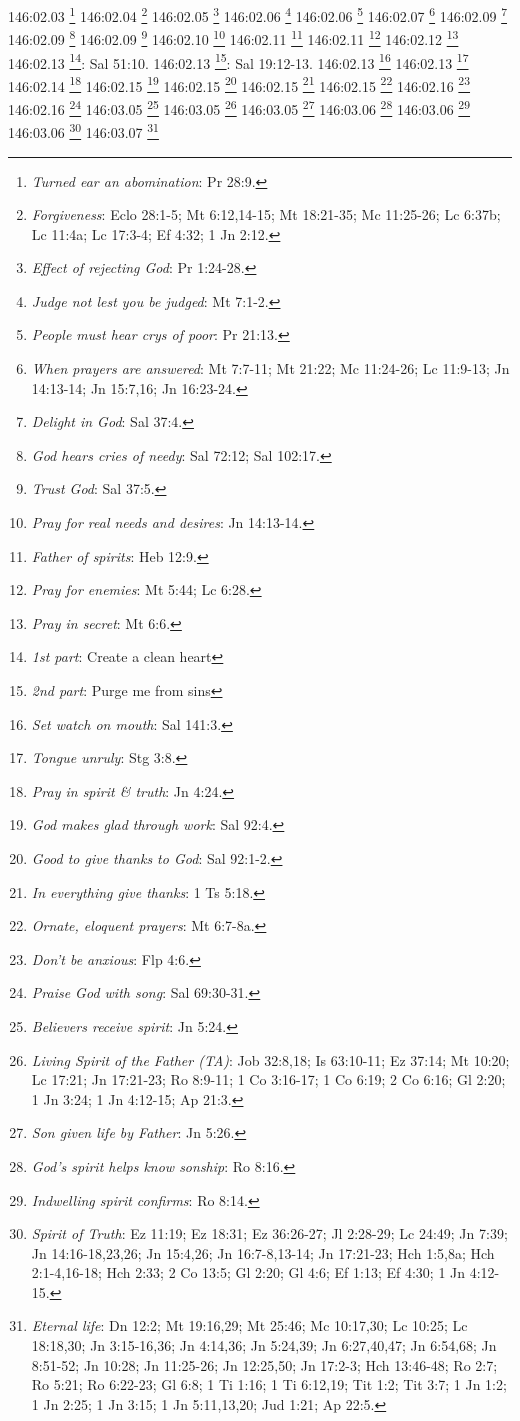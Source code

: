 {{{{{{{{{{{{{{{{{{{{{{{{{{{{146:02.03 \footnote{\textit{Turned ear an abomination}: Pr 28:9.}
146:02.04 \footnote{\textit{Forgiveness}: Eclo 28:1-5; Mt 6:12,14-15; Mt 18:21-35; Mc 11:25-26; Lc 6:37b; Lc 11:4a; Lc 17:3-4; Ef 4:32; 1 Jn 2:12.}
146:02.05 \footnote{\textit{Effect of rejecting God}: Pr 1:24-28.}
146:02.06 \footnote{\textit{Judge not lest you be judged}: Mt 7:1-2.}
146:02.06 \footnote{\textit{People must hear crys of poor}: Pr 21:13.}
146:02.07 \footnote{\textit{When prayers are answered}: Mt 7:7-11; Mt 21:22; Mc 11:24-26; Lc 11:9-13; Jn 14:13-14; Jn 15:7,16; Jn 16:23-24.}
146:02.09 \footnote{\textit{Delight in God}: Sal 37:4.}
146:02.09 \footnote{\textit{God hears cries of needy}: Sal 72:12; Sal 102:17.}
146:02.09 \footnote{\textit{Trust God}: Sal 37:5.}
146:02.10 \footnote{\textit{Pray for real needs and desires}: Jn 14:13-14.}
146:02.11 \footnote{\textit{Father of spirits}: Heb 12:9.}
146:02.11 \footnote{\textit{Pray for enemies}: Mt 5:44; Lc 6:28.}
146:02.12 \footnote{\textit{Pray in secret}: Mt 6:6.}
146:02.13 \footnote{\textit{1st part}: Create a clean heart}: Sal 51:10.}
146:02.13 \footnote{\textit{2nd part}: Purge me from sins}: Sal 19:12-13.}
146:02.13 \footnote{\textit{Set watch on mouth}: Sal 141:3.}
146:02.13 \footnote{\textit{Tongue unruly}: Stg 3:8.}
146:02.14 \footnote{\textit{Pray in spirit & truth}: Jn 4:24.}
146:02.15 \footnote{\textit{God makes glad through work}: Sal 92:4.}
146:02.15 \footnote{\textit{Good to give thanks to God}: Sal 92:1-2.}
146:02.15 \footnote{\textit{In everything give thanks}: 1 Ts 5:18.}
146:02.15 \footnote{\textit{Ornate, eloquent prayers}: Mt 6:7-8a.}
146:02.16 \footnote{\textit{Don't be anxious}: Flp 4:6.}
146:02.16 \footnote{\textit{Praise God with song}: Sal 69:30-31.}
146:03.05 \footnote{\textit{Believers receive spirit}: Jn 5:24.}
146:03.05 \footnote{\textit{Living Spirit of the Father (TA)}: Job 32:8,18; Is 63:10-11; Ez 37:14; Mt 10:20; Lc 17:21; Jn 17:21-23; Ro 8:9-11; 1 Co 3:16-17; 1 Co 6:19; 2 Co 6:16; Gl 2:20; 1 Jn 3:24; 1 Jn 4:12-15; Ap 21:3.}
146:03.05 \footnote{\textit{Son given life by Father}: Jn 5:26.}
146:03.06 \footnote{\textit{God's spirit helps know sonship}: Ro 8:16.}
146:03.06 \footnote{\textit{Indwelling spirit confirms}: Ro 8:14.}
146:03.06 \footnote{\textit{Spirit of Truth}: Ez 11:19; Ez 18:31; Ez 36:26-27; Jl 2:28-29; Lc 24:49; Jn 7:39; Jn 14:16-18,23,26; Jn 15:4,26; Jn 16:7-8,13-14; Jn 17:21-23; Hch 1:5,8a; Hch 2:1-4,16-18; Hch 2:33; 2 Co 13:5; Gl 2:20; Gl 4:6; Ef 1:13; Ef 4:30; 1 Jn 4:12-15.}
146:03.07 \footnote{\textit{Eternal life}: Dn 12:2; Mt 19:16,29; Mt 25:46; Mc 10:17,30; Lc 10:25; Lc 18:18,30; Jn 3:15-16,36; Jn 4:14,36; Jn 5:24,39; Jn 6:27,40,47; Jn 6:54,68; Jn 8:51-52; Jn 10:28; Jn 11:25-26; Jn 12:25,50; Jn 17:2-3; Hch 13:46-48; Ro 2:7; Ro 5:21; Ro 6:22-23; Gl 6:8; 1 Ti 1:16; 1 Ti 6:12,19; Tit 1:2; Tit 3:7; 1 Jn 1:2; 1 Jn 2:25; 1 Jn 3:15; 1 Jn 5:11,13,20; Jud 1:21; Ap 22:5.}
}}}}}}}}}}}}}}}}}}}}}}}}}}
